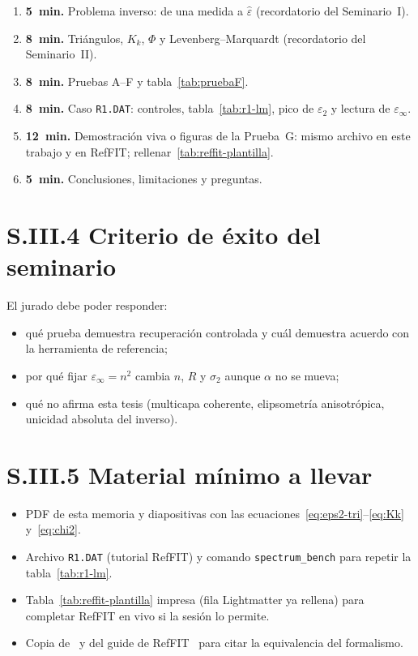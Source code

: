 \begin{enumerate}[leftmargin=*]
\item \textbf{5~min.} Problema inverso: de una medida a $\hat\varepsilon$ (recordatorio del Seminario~I).
\item \textbf{8~min.} Tri\'angulos, $K_k$, $\Phi$ y Levenberg--Marquardt (recordatorio del Seminario~II).
\item \textbf{8~min.} Pruebas A--F y tabla~\ref{tab:pruebaF}.
\item \textbf{8~min.} Caso \texttt{R1.DAT}: controles, tabla~\ref{tab:r1-lm}, pico de $\varepsilon_2$ y lectura de $\varepsilon_\infty$.
\item \textbf{12~min.} Demostraci\'on viva o figuras de la Prueba~G: mismo archivo en este trabajo y en RefFIT; rellenar~\ref{tab:reffit-plantilla}.
\item \textbf{5~min.} Conclusiones, limitaciones y preguntas.
\end{enumerate}

\section*{S.III.4 Criterio de \'exito del seminario}

El jurado debe poder responder:
\begin{itemize}[leftmargin=*]
\item qu\'e prueba demuestra recuperaci\'on controlada y cu\'al demuestra acuerdo con la herramienta de referencia;
\item por qu\'e fijar $\varepsilon_\infty=n^{2}$ cambia $n$, $R$ y $\sigma_2$ aunque $\alpha$ no se mueva;
\item qu\'e no afirma esta tesis (multicapa coherente, elipsometr\'ia anisotr\'opica, unicidad absoluta del inverso).
\end{itemize}

\section*{S.III.5 Material m\'inimo a llevar}

\begin{itemize}[leftmargin=*]
\item PDF de esta memoria y diapositivas con las ecuaciones~\eqref{eq:eps2-tri}--\eqref{eq:Kk} y~\eqref{eq:chi2}.
\item Archivo \texttt{R1.DAT} (tutorial RefFIT) y comando \texttt{spectrum\_bench} para repetir la tabla~\ref{tab:r1-lm}.
\item Tabla~\ref{tab:reffit-plantilla} impresa (fila Lightmatter ya rellena) para completar RefFIT en vivo si la sesi\'on lo permite.
\item Copia de~\cite{constrained} y del guide de RefFIT~\cite{guide} para citar la equivalencia del formalismo.
\end{itemize}


